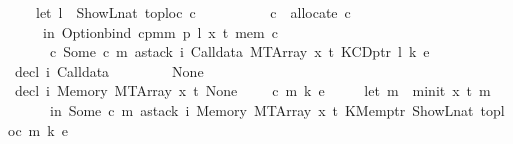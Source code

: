 \begin{isabellebody}
\ \ \ \ {\isacharparenleft}{\kern0pt}let\ l\ {\isacharequal}{\kern0pt}\ ShowL\isactrlsub n\isactrlsub a\isactrlsub t\ {\isacharparenleft}{\kern0pt}toploc\ c{\isacharparenright}{\kern0pt}{\isacharsemicolon}{\kern0pt}\isanewline
\ \ \ \ \ \ \ \ \ {\isacharparenleft}{\kern0pt}{\isacharunderscore}{\kern0pt}{\isacharcomma}{\kern0pt}\ c{\isacharprime}{\kern0pt}{\isacharparenright}{\kern0pt}\ {\isacharequal}{\kern0pt}\ allocate\ c\isanewline
\ \ \ \ \ in\ Option{\isachardot}{\kern0pt}bind\ {\isacharparenleft}{\kern0pt}cpm{}m\ p\ l\ x\ t\ mem\ c{\isacharprime}{\kern0pt}{\isacharparenright}{\kern0pt}\isanewline
\ \ \ \ \ \ {\isacharparenleft}{\kern0pt}{\isasymlambda}c{\isacharprime}{\kern0pt}{\isacharprime}{\kern0pt}{\isachardot}{\kern0pt}\ Some\ {\isacharparenleft}{\kern0pt}c{\isacharprime}{\kern0pt}{\isacharprime}{\kern0pt}{\isacharcomma}{\kern0pt}\ m{\isacharcomma}{\kern0pt}\ astack\ i\ {\isacharparenleft}{\kern0pt}Calldata\ {\isacharparenleft}{\kern0pt}MTArray\ x\ t{\isacharparenright}{\kern0pt}{\isacharparenright}{\kern0pt}\ {\isacharparenleft}{\kern0pt}KCDptr\ l{\isacharparenright}{\kern0pt}\ {\isacharparenleft}{\kern0pt}k{\isacharcomma}{\kern0pt}\ e{\isacharparenright}{\kern0pt}{\isacharparenright}{\kern0pt}{\isacharparenright}{\kern0pt}{\isacharparenright}{\kern0pt}{\isachardoublequoteclose}\isanewline
{\isacharbar}{\kern0pt}\ {\isachardoublequoteopen}decl\ i\ {\isacharparenleft}{\kern0pt}Calldata\ {\isacharunderscore}{\kern0pt}{\isacharparenright}{\kern0pt}\ {\isacharunderscore}{\kern0pt}\ {\isacharunderscore}{\kern0pt}\ {\isacharunderscore}{\kern0pt}\ {\isacharunderscore}{\kern0pt}\ {\isacharunderscore}{\kern0pt}\ {\isacharunderscore}{\kern0pt}\ {\isacharequal}{\kern0pt}\ None{\isachardoublequoteclose}\isanewline
\isanewline
\isanewline
{\isacharbar}{\kern0pt}\ {\isachardoublequoteopen}decl\ i\ {\isacharparenleft}{\kern0pt}Memory\ {\isacharparenleft}{\kern0pt}MTArray\ x\ t{\isacharparenright}{\kern0pt}{\isacharparenright}{\kern0pt}\ None\ {\isacharunderscore}{\kern0pt}\ {\isacharunderscore}{\kern0pt}\ {\isacharunderscore}{\kern0pt}\ {\isacharunderscore}{\kern0pt}\ {\isacharparenleft}{\kern0pt}c{\isacharcomma}{\kern0pt}\ m{\isacharcomma}{\kern0pt}\ k{\isacharcomma}{\kern0pt}\ e{\isacharparenright}{\kern0pt}\ {\isacharequal}{\kern0pt}\isanewline
\ \ \ \ {\isacharparenleft}{\kern0pt}let\ m{\isacharprime}{\kern0pt}\ {\isacharequal}{\kern0pt}\ minit\ x\ t\ m\isanewline
\ \ \ \ \ \ in\ Some\ {\isacharparenleft}{\kern0pt}c{\isacharcomma}{\kern0pt}\ m{\isacharprime}{\kern0pt}{\isacharcomma}{\kern0pt}\ astack\ i\ {\isacharparenleft}{\kern0pt}Memory\ {\isacharparenleft}{\kern0pt}MTArray\ x\ t{\isacharparenright}{\kern0pt}{\isacharparenright}{\kern0pt}\ {\isacharparenleft}{\kern0pt}KMemptr\ {\isacharparenleft}{\kern0pt}ShowL\isactrlsub n\isactrlsub a\isactrlsub t\ {\isacharparenleft}{\kern0pt}toploc\ m{\isacharparenright}{\kern0pt}{\isacharparenright}{\kern0pt}{\isacharparenright}{\kern0pt}\ {\isacharparenleft}{\kern0pt}k{\isacharcomma}{\kern0pt}\ e{\isacharparenright}{\kern0pt}{\isacharparenright}{\kern0pt}{\isacharparenright}{\kern0pt}{\isachardoublequoteclose}\isanewline

\end{isabellebody}
